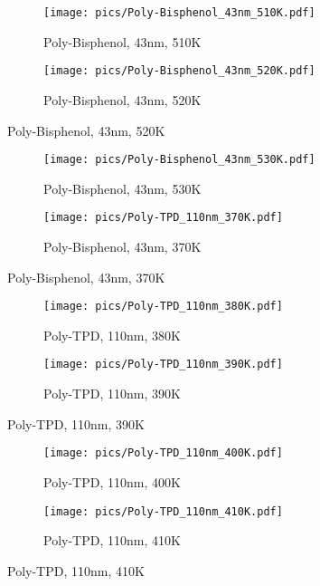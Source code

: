 \begin{figure}[!htb]
\centering
\begin{subfigure}[t]{.5\textwidth}
  \centering
  \texttt{[image: pics/Poly-Bisphenol\_43nm\_510K.pdf]}
  \caption{Poly-Bisphenol, 43nm, 510K}
  \label{fig:sub41}
\end{subfigure}%
\begin{subfigure}[t]{.5\textwidth}
  \centering
  \texttt{[image: pics/Poly-Bisphenol\_43nm\_520K.pdf]}
  \caption{Poly-Bisphenol, 43nm, 520K}
  \label{fig:sub42}
\end{subfigure}%
\end{figure}

\begin{figure}[!htb]
\centering
\begin{subfigure}[t]{.5\textwidth}
  \centering
  \texttt{[image: pics/Poly-Bisphenol\_43nm\_530K.pdf]}
  \caption{Poly-Bisphenol, 43nm, 530K}
  \label{fig:sub43}
\end{subfigure}%
\begin{subfigure}[t]{.5\textwidth}
  \centering
  \texttt{[image: pics/Poly-TPD\_110nm\_370K.pdf]}
  \caption{Poly-Bisphenol, 43nm, 370K}
  \label{fig:sub44}
\end{subfigure}%
\end{figure}

\begin{figure}[!htb]
\centering
\begin{subfigure}[t]{.5\textwidth}
  \centering
  \texttt{[image: pics/Poly-TPD\_110nm\_380K.pdf]}
  \caption{Poly-TPD, 110nm, 380K}
  \label{fig:sub45}
\end{subfigure}%
\begin{subfigure}[t]{.5\textwidth}
  \centering
  \texttt{[image: pics/Poly-TPD\_110nm\_390K.pdf]}
  \caption{Poly-TPD, 110nm, 390K}
  \label{fig:sub46}
\end{subfigure}%
\end{figure}

\begin{figure}[!htb]
\centering
\begin{subfigure}[t]{.5\textwidth}
  \centering
  \texttt{[image: pics/Poly-TPD\_110nm\_400K.pdf]}
  \caption{Poly-TPD, 110nm, 400K}
  \label{fig:sub47}
\end{subfigure}%
\begin{subfigure}[t]{.5\textwidth}
  \centering
  \texttt{[image: pics/Poly-TPD\_110nm\_410K.pdf]}
  \caption{Poly-TPD, 110nm, 410K}
  \label{fig:sub48}
\end{subfigure}%
\end{figure}

